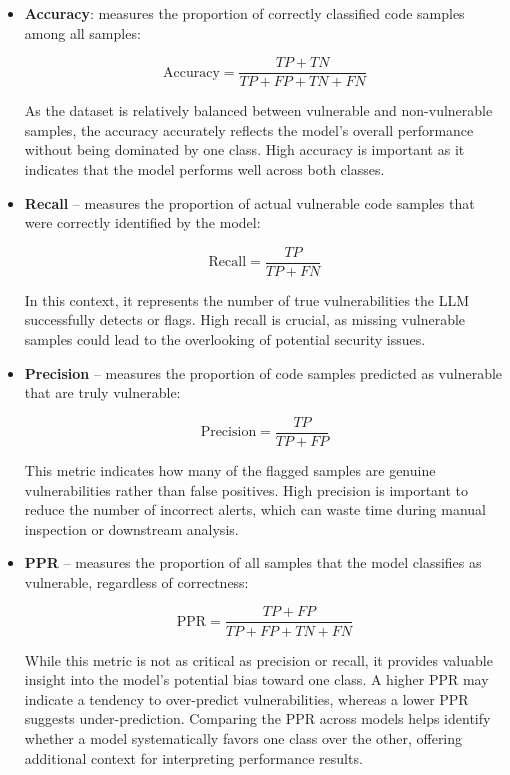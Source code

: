 \documentclass[lettersize,journal]{IEEEtran}
\begin{document}
\begin{itemize}
    \item \textbf{Accuracy}: measures the proportion of correctly classified code samples among all samples:

    \begin{equation}
    \text{Accuracy} = \frac{TP+TN}{TP+FP+TN+FN}
    \end{equation}
    
    As the dataset is relatively balanced between vulnerable and non-vulnerable samples, the accuracy accurately reflects the model’s overall performance without being dominated by one class. High accuracy is important as it indicates that the model performs well across both classes.
    
    \item \textbf{Recall} – measures the proportion of actual vulnerable code samples that were correctly identified by the model:
    
    \begin{equation}
        \text{Recall} = \frac{TP}{TP+FN}
    \end{equation}
    
    In this context, it represents the number of true vulnerabilities the \gls{LLM} successfully detects or flags. High recall is crucial, as missing vulnerable samples could lead to the overlooking of potential security issues.
    
    \item \textbf{Precision} – measures the proportion of code samples predicted as vulnerable that are truly vulnerable: 
    
    \begin{equation}
        \text{Precision} = \frac{TP}{TP+FP}
    \end{equation}
    
    This metric indicates how many of the flagged samples are genuine vulnerabilities rather than false positives. High precision is important to reduce the number of incorrect alerts, which can waste time during manual inspection or downstream analysis.
    
    \item \textbf{\gls{PPR}} – measures the proportion of all samples that the model classifies as vulnerable, regardless of correctness:
    
    \begin{equation}
    \text{PPR} = \frac{TP+FP}{TP+FP+TN+FN}
    \end{equation}
    
    While this metric is not as critical as precision or recall, it provides valuable insight into the model’s potential bias toward one class. A higher PPR may indicate a tendency to over-predict vulnerabilities, whereas a lower PPR suggests under-prediction. Comparing the PPR across models helps identify whether a model systematically favors one class over the other, offering additional context for interpreting performance results.

\end{itemize}
\end{document}
